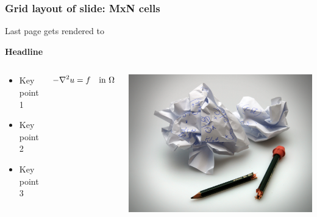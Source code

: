 \documentclass{beamer}
\begin{document}
\begin{frame}
\frametitle{Grid layout of slide: MxN cells}

Last page gets rendered to




\noindent\textbf{\Large Headline}

\begin{columns}

\pause
\begin{block}{}
\begin{itemize}
 \item Key point 1

 \item Key point 2

 \item Key point 3
\end{itemize}

\noindent
\end{block}



\pause
\begin{block}{}
\[ -\nabla^2 u = f \quad\hbox{in }\Omega \]
\end{block}



\begin{center}  %
  \centerline{\includegraphics[width=0.9\linewidth]{fig/broken_pen_and_paper.jpg}}
\end{center}


\end{columns}
\end{frame}
\end{document}
